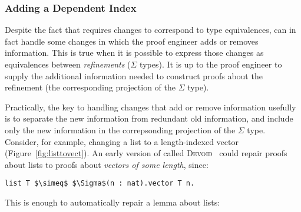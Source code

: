 \subsubsection{Adding a Dependent Index}
\label{sec:ex2}

Despite the fact that \toolname requires changes to correspond to type equivalences,
\toolname can in fact handle some changes in which the proof engineer adds or removes information.
This is true when it is possible to express those changes as equivalences between \textit{refinements} ($\Sigma$ types).
It is up to the proof engineer to supply the additional information needed to construct proofs about the refinement
(the corresponding projection of the $\Sigma$ type).



\begin{figure*}
\begin{minipage}{0.40\textwidth}
   
\end{minipage}
\hfill
\begin{minipage}{0.58\textwidth}
   
\end{minipage}
\vspace{-0.3cm}
\caption{A vector (right) is a list (left) indexed by its length.}
\label{fig:listtovect}
\end{figure*}

Practically, the key to handling changes that add or remove information usefully is to separate the new information from redundant old information, 
and include only the new information in the correpsonding projection of the $\Sigma$ type.
Consider, for example, changing a list to a length-indexed vector (Figure~\ref{fig:listtovect}).
An early version of \toolname called \textsc{Devoid}~\cite{Ringer2019} could repair proofs about lists to proofs about \textit{vectors of some length}, since:

\begin{lstlisting}
list T $\simeq$ $\Sigma$(n : nat).vector T n.
\end{lstlisting}
This is enough to automatically repair a lemma about lists:

